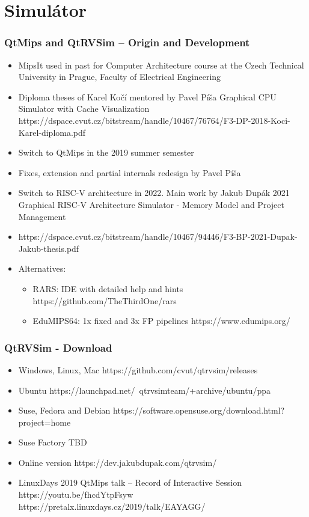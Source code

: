 \documentclass{beamer}
\subtitle{Lekce 03. Central Processing Unit (CPU)}
\author{Pavel Píša\\ \small\texttt{pisa@fel.cvut.cz}}
\begin{document}
\maketitle

\section{Simulátor}

\begin{frame}
\frametitle{QtMips and QtRVSim – Origin and Development}

\begin{itemize}
\item MipsIt used in past for Computer Architecture course at the Czech Technical University in Prague, Faculty of Electrical Engineering
\item Diploma theses of Karel Kočí mentored by Pavel Píša
Graphical CPU Simulator with Cache Visualization
https://dspace.cvut.cz/bitstream/handle/10467/76764/F3-DP-2018-Koci-Karel-diploma.pdf
\item Switch to QtMips in the 2019 summer semester
\item Fixes, extension and partial internals redesign by Pavel Píša
\item Switch to RISC-V architecture in 2022. Main work by Jakub Dupák 2021
Graphical RISC-V Architecture Simulator - Memory Model and Project Management
\item https://dspace.cvut.cz/bitstream/handle/10467/94446/F3-BP-2021-Dupak-Jakub-thesis.pdf

\item Alternatives:
\begin{itemize}
 \item RARS: IDE with detailed help and hints
 https://github.com/TheThirdOne/rars
 \item EduMIPS64: 1x fixed and 3x FP pipelines
 https://www.edumips.org/
\end{itemize}
\end{itemize}

\end{frame}


\begin{frame}
\frametitle{QtRVSim - Download}
\begin{itemize}
\item Windows, Linux, Mac
https://github.com/cvut/qtrvsim/releases
\item  Ubuntu
https://launchpad.net/~qtrvsimteam/+archive/ubuntu/ppa
\item Suse, Fedora and Debian
https://software.opensuse.org/download.html?project=home%
\item Suse Factory
TBD
\item Online version
https://dev.jakubdupak.com/qtrvsim/
\item LinuxDays 2019 QtMips talk – Record of Interactive Session
https://youtu.be/fhcdYtpFsyw
https://pretalx.linuxdays.cz/2019/talk/EAYAGG/
\end{itemize}
\end{frame}
\end{document}
